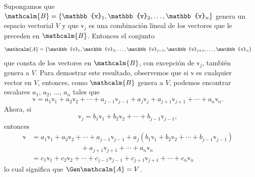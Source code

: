 Supongamos que $\mathcalm{B} = \{\mathbb{v}_1, \mathbb{v}_2, \dots, \mathbb{v}_n\}$ genera un espacio vectorial $V$ y que $\mathbb{v}_j$ es una combinación lineal de los vectores que le preceden en $\mathcalm{B}$. Entonces el conjunto
$$\mathcalm{A} = \{\mathbb{v}_1, \mathbb{v}_2, \dots, \mathbb{v}_{j-1}, \mathbb{v}_{j+1}, \dots, \mathbb{v}_n\}$$
que consta de los vectores en $\mathcalm{B}$, con excepción de $\mathbb{v}_j$, también genera a $V$. Para demostrar este resultado, observemos que si $\mathbb{v}$ es cualquier vector en $V$, entonces, como $\mathcalm{B}$ genera a $V$, podemos encontrar escalares $a_1$, $a_2$, $\dots$, $a_n$ tales que
$$\mathbb{v} = a_1 \mathbb{v}_1 + a_2 \mathbb{v}_2 + \cdots + a_{j-1} \mathbb{v}_{j-1} + a_j \mathbb{v}_j + a_{j+1} \mathbb{v}_{j+1} + \cdots + a_n \mathbb{v}_n.$$
Ahora, si
$$\mathbb{v}_j = b_1 \mathbb{v}_1 + b_2 \mathbb{v}_2 + \cdots + b_{j-1} \mathbb{v}_{j-1},$$
entonces
\begin{align*}
    \mathbb{v} & = a_1 \mathbb{v}_1 + a_2 \mathbb{v}_2 + \cdots + a_{j-1} \mathbb{v}_{j-1} + a_j (b_1 \mathbb{v}_1 + b_2 \mathbb{v}_2 + \cdots + b_{j-1} \mathbb{v}_{j-1}) \\
    & \hspace{3cm} + a_{j+1} \mathbb{v}_{j+1} + \cdots + a_n \mathbb{v}_n \\
    & = c_1 \mathbb{v}_1 + c_2 \mathbb{v}_2 + \cdots + c_{j-1} \mathbb{v}_{j-1} + c_{j+1} \mathbb{v}_{j+1} + \cdots + c_n \mathbb{v}_n
\end{align*}
lo cual significa que $\Gen \mathcalm{A} = V$.

